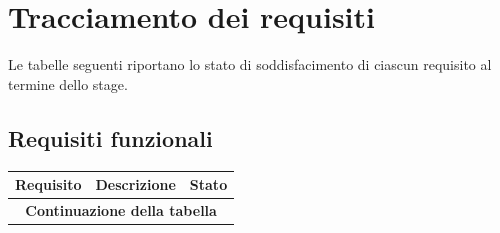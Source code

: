 \section{Tracciamento dei requisiti}
\label{sec:tracciamento-requisiti}

Le tabelle seguenti riportano lo stato di soddisfacimento di ciascun requisito al termine dello stage.

\subsection{Requisiti funzionali}

\begin{center}
\begin{longtable}{|p{2.1cm}|p{7.5cm}|p{2.4cm}|}
\hline
\multicolumn{1}{|c|}{\textbf{Requisito}} &
\multicolumn{1}{c|}{\textbf{Descrizione}} &
\multicolumn{1}{c|}{\textbf{Stato}} \\
\hline
\endfirsthead
\hline
\multicolumn{3}{c}{{\bfseries Continuazione della tabella}}\\
\hline
\endhead


\end{longtable}
\end{center}

